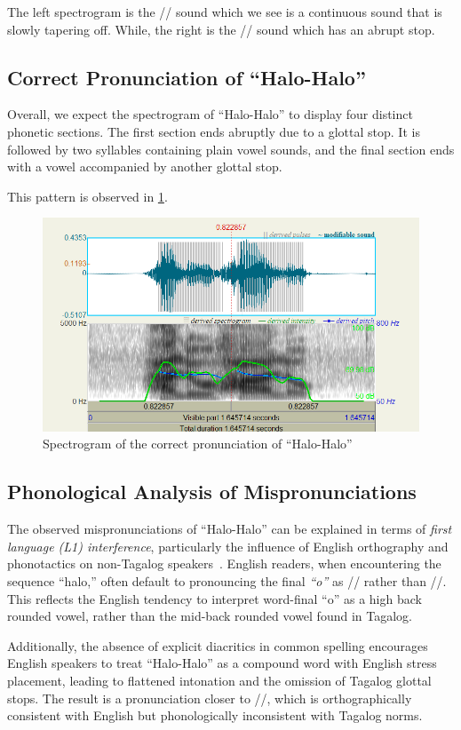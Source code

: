 \documentclass{article}
\begin{document}
	The left spectrogram is the // sound which we see is a continuous
	sound that is slowly tapering off. While, the right is the // sound
	which has an abrupt stop.
	
	\subsection{Correct Pronunciation of ``Halo-Halo''}
	Overall, we expect the spectrogram of ``Halo-Halo'' to display four distinct
	phonetic sections. The first section ends abruptly due to a glottal stop. It is
	followed by two syllables containing plain vowel sounds, and the final section
	ends with a vowel accompanied by another glottal stop.
	
	This pattern is observed in \cref{fig:correct}.
	
	\begin{figure}
		\centering
		\includegraphics[width=0.65\linewidth]{img/correct.png}
		\caption{Spectrogram of the correct pronunciation of ``Halo-Halo''}\label{fig:correct}
	\end{figure}
	
	\subsection{Phonological Analysis of Mispronunciations}
	
	The observed mispronunciations of ``Halo-Halo'' can be explained in terms of
	\emph{first language (L1) interference}, particularly the influence of English
	orthography and phonotactics on non-Tagalog speakers~\cite{hansenedwards2008phonology}. English readers, when
	encountering the sequence ``halo,'' often default to pronouncing the final
	\emph{``o''} as // rather than //. This reflects the
	English tendency to interpret word-final ``o'' as a high back rounded vowel,
	rather than the mid-back rounded vowel found in Tagalog.
	
	Additionally, the absence of explicit diacritics in common spelling
	encourages English speakers to treat ``Halo-Halo'' as a compound word with
	English stress placement, leading to flattened intonation and the omission of
	Tagalog glottal stops. The result is a pronunciation closer to
	//, which is orthographically consistent with English but
	phonologically inconsistent with Tagalog norms.
	
\end{document}
